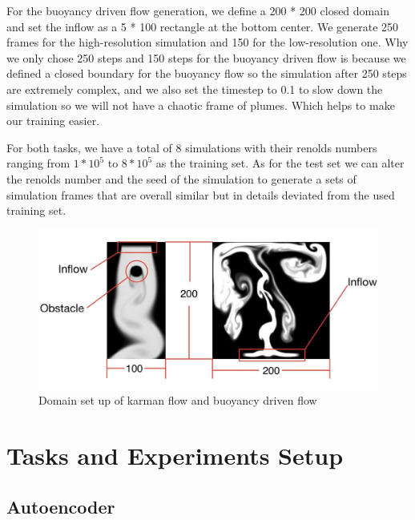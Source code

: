 \documentclass[a4paper,12pt,twoside]{report}
\begin{document}
For the buoyancy driven flow generation, we define a 200 * 200 closed domain and set the inflow as a 5 * 100 rectangle at the bottom center. We generate 250 frames for the high-resolution simulation and 150 for the low-resolution one. Why we only chose 250 steps and 150 steps for the buoyancy driven flow is because we defined a closed boundary for the buoyancy flow so the simulation after 250 steps are extremely complex, and we also set the timestep to 0.1 to slow down the simulation so we will not have a chaotic frame of plumes. Which helps to make our training easier.

For both tasks, we have a total of 8 simulations with their renolds numbers ranging from $1*10^5$ to $8*10^5$ as the training set. As for the test set we can alter the renolds number and the seed of the simulation to generate a sets of simulation frames that are overall similar but in details deviated from the used training set. 
\begin{figure}
	\centering
	\includegraphics[width=1.0\textwidth]{domaindescription.jpg}
	\caption{Domain set up of karman flow and buoyancy driven flow}
\end{figure}







\chapter{Tasks and Experiments Setup}

\section{Autoencoder}
\end{document}
